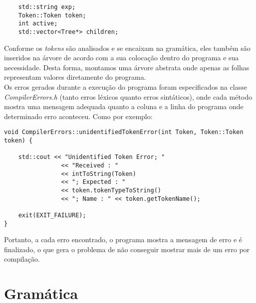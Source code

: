 \documentclass[12pt,a4paper,final]{article}
\begin{document}
\begin{lstlisting}
	std::string exp;
	Token::Token token;
	int active;
	std::vector<Tree*> children;
\end{lstlisting}

Conforme os \textit{tokens} são analisados e se encaixam na gramática, eles também são inseridos na árvore de acordo com a sua colocação dentro do programa e sua necessidade. Desta forma, montamos uma árvore abstrata onde apenas as folhas representam valores diretamente do programa.\\

Os erros gerados durante a execução do programa foram especificados na classe \textit{CompilerErrors.h} (tanto erros léxicos quanto erros sintáticos), onde cada método mostra uma mensagem adequada quanto a coluna e a linha do programa onde determinado erro aconteceu. Como por exemplo:

\begin{lstlisting}
void CompilerErrors::unidentifiedTokenError(int Token, Token::Token token) {

	std::cout << "Unidentified Token Error; "
				<< "Received : "
                << intToString(Token)
                << "; Expected : "
                << token.tokenTypeToString()
                << "; Name : " << token.getTokenName();
                
	exit(EXIT_FAILURE);
}
\end{lstlisting}

Portanto, a cada erro encontrado, o programa mostra a mensagem de erro e é finalizado, o que gera o problema de não conseguir mostrar mais de um erro por compilação.

\section*{Gramática}
\end{document}
